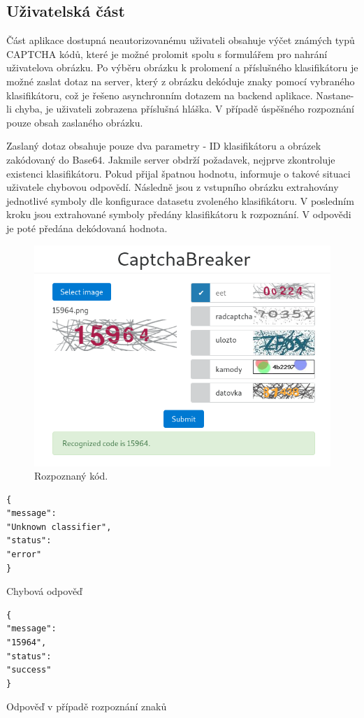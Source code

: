 \documentclass[
  field=ainfp,
  master=true,
  biblatex,
  sourcecodes=false,
  theorems=false,
  glossaries,
  index
]{kidiplom}
\begin{document}
\subsection{Uživatelská část}
Část aplikace dostupná neautorizovanému uživateli obsahuje výčet známých typů CAPTCHA kódů, které je možné prolomit spolu s formulářem pro nahrání uživatelova obrázku. Po výběru obrázku k prolomení a příslušného klasifikátoru je možné zaslat dotaz na server, který z obrázku dekóduje znaky pomocí vybraného klasifikátoru, což je řešeno asynchronním dotazem na backend aplikace. Nastane-li chyba, je uživateli zobrazena příslušná hláška. V případě úspěšného rozpoznání pouze obsah zaslaného obrázku.

Zaslaný dotaz obsahuje pouze dva parametry - ID klasifikátoru a obrázek zakódovaný do Base64. Jakmile server obdrží požadavek, nejprve zkontroluje existenci klasifikátoru. Pokud přijal špatnou hodnotu, informuje o takové situaci uživatele chybovou odpovědí. Následně jsou z vstupního obrázku extrahovány jednotlivé symboly dle konfigurace datasetu zvoleného klasifikátoru. V posledním kroku jsou extrahované symboly předány klasifikátoru k rozpoznání. V odpovědi je poté předána dekódovaná hodnota.

\begin{figure}[H]
  \centering
  \includegraphics[scale=0.6]{images/website_public.png}
  \caption{Rozpoznaný kód.}
  \label{fig:captcha_geetest}
\end{figure}

\begin{minipage}{0.45\textwidth}
\begin{verbatim}
{
"message":
"Unknown classifier",
"status":
"error"
}
\end{verbatim}
Chybová odpověď
\end{minipage}
\hfill
\begin{minipage}{0.45\textwidth}
\begin{verbatim}
{
"message":
"15964",
"status":
"success"
}
\end{verbatim}
Odpověď v případě rozpoznání znaků
\end{minipage}
\end{document}
